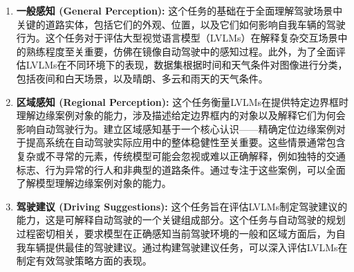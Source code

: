 \documentclass[
    linespread = 1.25
]{ctexart}
\begin{document}
\begin{enumerate}
  \item \textbf{一般感知 (General Perception):}
        这个任务的基础在于全面理解驾驶场景中关键的道路实体，包括它们的外观、位置，以及它们如何影响自我车辆的驾驶行为。这个任务对于评估大型视觉语言模型（LVLMs）在解释复杂交互场景中的熟练程度至关重要，仿佛在镜像自动驾驶中的感知过程。此外，为了全面评估LVLMs在不同环境下的表现，数据集根据时间和天气条件对图像进行分类，包括夜间和白天场景，以及晴朗、多云和雨天的天气条件。

  \item \textbf{区域感知 (Regional Perception):}
        这个任务衡量LVLMs在提供特定边界框时理解边缘案例对象的能力，涉及描述给定边界框内的对象以及解释它们为何会影响自动驾驶行为。建立区域感知基于一个核心认识——精确定位边缘案例对于提高系统在自动驾驶实际应用中的整体稳健性至关重要。这些情景通常包含复杂或不寻常的元素，传统模型可能会忽视或难以正确解释，例如独特的交通标志、行为异常的行人和非典型的道路条件。通过专注于这些案例，可以全面了解模型理解边缘案例对象的能力。

  \item \textbf{驾驶建议 (Driving Suggestions):}
        这个任务旨在评估LVLMs制定驾驶建议的能力，这是可解释自动驾驶的一个关键组成部分。这个任务与自动驾驶的规划过程密切相关，要求模型在正确感知当前驾驶环境的一般和区域方面后，为自我车辆提供最佳的驾驶建议。通过构建驾驶建议任务，可以深入评估LVLMs在制定有效驾驶策略方面的表现。
\end{enumerate}
\end{document}
